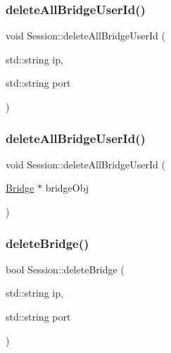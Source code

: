 \subsubsection{\texorpdfstring{delete\+All\+Bridge\+User\+Id()}{deleteAllBridgeUserId()}\hspace{0.1cm}{\footnotesize\ttfamily [2/3]}}
{\footnotesize\ttfamily void Session\+::delete\+All\+Bridge\+User\+Id (\begin{DoxyParamCaption}\item[{std\+::string}]{ip,  }\item[{std\+::string}]{port }\end{DoxyParamCaption})}

\mbox{\label{class_session_ad209a3bf4d24d5f1aff23a011ef25f6f}} 
\subsubsection{\texorpdfstring{delete\+All\+Bridge\+User\+Id()}{deleteAllBridgeUserId()}\hspace{0.1cm}{\footnotesize\ttfamily [3/3]}}
{\footnotesize\ttfamily void Session\+::delete\+All\+Bridge\+User\+Id (\begin{DoxyParamCaption}\item[{\hyperlink{class_bridge}{Bridge} $\ast$}]{bridge\+Obj }\end{DoxyParamCaption})}

\mbox{\label{class_session_ab227752536d56a50a7b54373098dccd3}} 
\subsubsection{\texorpdfstring{delete\+Bridge()}{deleteBridge()}}
{\footnotesize\ttfamily bool Session\+::delete\+Bridge (\begin{DoxyParamCaption}\item[{std\+::string}]{ip,  }\item[{std\+::string}]{port }\end{DoxyParamCaption})}

\mbox{\label{class_session_a0ce543e30e589f57f424b223e78d7727}} 
